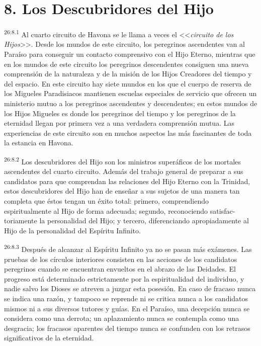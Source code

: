 \section*{8. Los Descubridores del Hijo}
\par
\textsuperscript{26:8.1} Al cuarto circuito de Havona se le llama a veces el <<\textit{circuito de los Hijos}>>. Desde los mundos de este circuito, los peregrinos ascendentes van al Paraíso para conseguir un contacto comprensivo con el Hijo Eterno, mientras que en los mundos de este circuito los peregrinos descendentes consiguen una nueva comprensión de la naturaleza y de la misión de los Hijos Creadores del tiempo y del espacio. En este circuito hay siete mundos en los que el cuerpo de reserva de los Migueles Paradisiacos mantienen escuelas especiales de servicio que ofrecen un ministerio mutuo a los peregrinos ascendentes y descendentes; en estos mundos de los Hijos Migueles es donde los peregrinos del tiempo y los peregrinos de la eternidad llegan por primera vez a una verdadera comprensión mutua. Las experiencias de este circuito son en muchos aspectos las más fascinantes de toda la estancia en Havona.

\par
\textsuperscript{26:8.2} Los descubridores del Hijo son los ministros superáficos de los mortales ascendentes del cuarto circuito. Además del trabajo general de preparar a sus candidatos para que comprendan las relaciones del Hijo Eterno con la Trinidad, estos descubridores del Hijo han de enseñar a sus sujetos de una manera tan completa que éstos tengan un éxito total: primero, comprendiendo espiritualmente al Hijo de forma adecuada; segundo, reconociendo satisfac-toriamente la personalidad del Hijo; y tercero, diferenciando apropiadamente al Hijo de la personalidad del Espíritu Infinito.

\par
\textsuperscript{26:8.3} Después de alcanzar al Espíritu Infinito ya no se pasan más exámenes. Las pruebas de los círculos interiores consisten en las acciones de los candidatos peregrinos cuando se encuentran envueltos en el abrazo de las Deidades. El progreso está determinado estrictamente por la espiritualidad del individuo, y nadie salvo los Dioses se atreven a juzgar esta posesión. En caso de fracaso nunca se indica una razón, y tampoco se reprende ni se critica nunca a los candidatos mismos ni a sus diversos tutores y guías. En el Paraíso, una decepción nunca se considera como una derrota; un aplazamiento nunca se contempla como una desgracia; los fracasos aparentes del tiempo nunca se confunden con los retrasos significativos de la eternidad.

